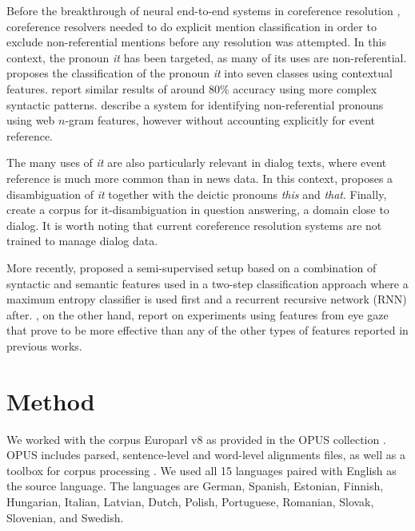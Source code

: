 \documentclass[10pt, a4paper]{article}
\begin{document}
%
% 
Before the breakthrough of neural end-to-end systems in coreference resolution
\cite{Lee:2017}, coreference resolvers needed to do explicit mention
classification in order to exclude non-referential mentions before any
resolution was attempted. In this context, the pronoun \textit{it} has been targeted,
as many of its uses are non-referential.  proposes the
classification of the pronoun \textit{it} into seven classes using contextual features.
 report similar results of around 80\% accuracy using more
complex syntactic patterns.  describe a system for
identifying non-referential pronouns using web $n$-gram features, however
without accounting explicitly for event reference.

The many uses of \textit{it} are also particularly relevant in dialog texts, where
event reference is much more common than in news data. In this context,
 proposes a disambiguation of \textit{it} together with
the deictic pronouns \textit{this} and \textit{that}.  Finally,  create a corpus
for it-disambiguation in question answering, a domain close to dialog. It is
worth noting that current coreference resolution systems are not trained to
manage dialog data.

More recently,   proposed a semi-supervised setup
based on a combination of syntactic and semantic features used in a two-step
classification approach where a maximum entropy classifier is used first and a
recurrent recursive network (RNN) after. ,
on the other hand, report on experiments using features from eye gaze that prove
to be more effective than any of the other types of features reported in
previous works.




\section{Method}

We worked with the corpus Europarl \cite{Koehn2005} v8 as provided in the OPUS 
collection \cite{TIEDEMANN12.463}. OPUS includes parsed, sentence-level 
and word-level alignments files, as well as a toolbox for corpus processing 
\cite{aulamo-et-al-opus}. We used all 15 languages paired with English as the 
source language. The languages are German, Spanish, Estonian, Finnish, 
Hungarian, Italian, Latvian, Dutch, Polish, Portuguese, Romanian, Slovak, 
Slovenian, and Swedish.
\end{document}
